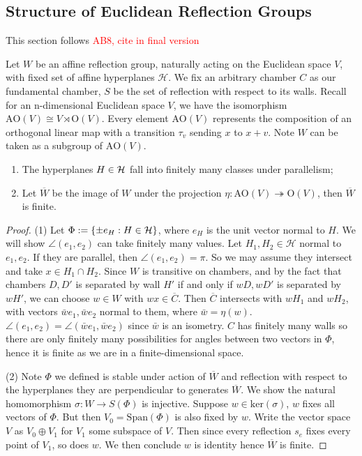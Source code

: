 \documentclass[../main.tex]{subfiles}
\begin{document}
\subsection{Structure of Euclidean Reflection Groups}

This section follows \textcolor{red}{AB8, cite in final version}

Let $W$ be an affine reflection group, naturally acting on the Euclidean space $V$, with fixed set of affine hyperplanes $\mathcal H$. We fix an arbitrary chamber $C$ as our fundamental chamber, $S$ be the set of reflection with respect to its walls. Recall for an n-dimensional Euclidean space $V$, we have the isomorphism $\text{AO}(V) \cong V \rtimes \text{O}(V)$. Every element $\text{AO}(V)$ represents the composition of an orthogonal linear map with a transition $\tau_v$ sending $x$ to $x+v$. Note $W$ can be taken as a subgroup of $\text{AO}(V)$.

\begin{theorem}\label{thm:finpara}
    \begin{enumerate}
        \item The hyperplanes $H\in \mathcal{H}$ fall into finitely many classes under parallelism;
        \item Let $\overline W$ be the image of $W$ under the projection $\eta: \text{AO}(V) \twoheadrightarrow \text{O} (V)$, then $\overline W$ is finite.
    \end{enumerate}
\end{theorem}

\begin{proof}
    (1) Let $\Phi := \{\pm e_H:H\in \mathcal{H}\}$, where $e_H$ is the unit vector normal to $H$. We will show $\angle(e_1,e_2)$ can take finitely many values. Let $H_1,H_2 \in \mathcal H$ normal to $e_1,e_2$. If they are parallel, then $\angle(e_1,e_2)=\pi$. So we may assume they intersect and take $x\in H_1\cap H_2$. Since $W$ is transitive on chambers, and by the fact that chambers $D,D'$ is separated by wall $H'$ if and only if $wD,wD'$ is separated by $wH'$, we can choose $w \in W$ with $wx\in \overline C$. Then $\overline C$ intersects with $wH_1$ and $wH_2$, with vectors $\bar we_1,\bar we_2$ normal to them, where $\bar w=\eta(w)$. $\angle(e_1,e_2)=\angle(\bar we_1,\bar we_2)$ since $\bar w$ is an isometry. $C$ has finitely many walls so there are only finitely many possibilities for angles between two vectors in $\Phi$, hence it is finite as we are in a finite-dimensional space.

    (2) Note $\Phi$ we defined is stable under action of $\overline W$ and reflection with respect to the hyperplanes they are perpendicular to generates $\overline W$. We show the natural homomorphism $\sigma:W \rightarrow S(\Phi)$ is injective. Suppose $w\in \text{ker}(\sigma)$, $w$ fixes all vectors of $\Phi$. But then $V_0=\text{Span}(\Phi)$ is also fixed by $w$. Write the vector space $V$ as $V_0\oplus V_1$ for $V_1$ some subspace of $V$. Then since every reflection $s_e$ fixes every point of $V_1$, so does $w$. We then conclude $w$ is identity hence $\overline W$ is finite.
\end{proof}
\end{document}
